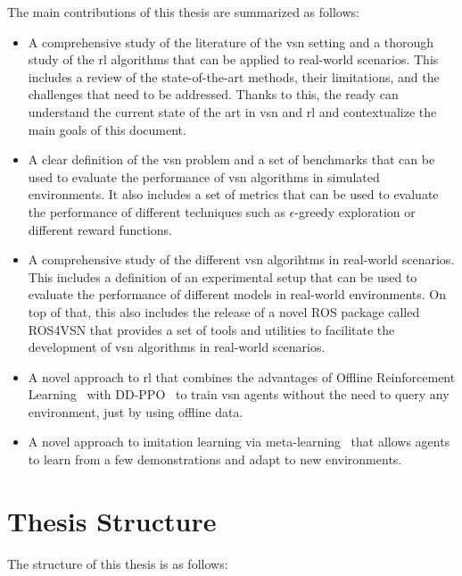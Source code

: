 The main contributions of this thesis are summarized as follows:
\begin{itemize}
    \item A comprehensive study of the literature of the \acrshort{vsn} setting and a thorough study of the \acrshort{rl} algorithms that can be applied to real-world scenarios.
    This includes a review of the state-of-the-art methods, their limitations, and the challenges that need to be addressed.
    Thanks to this, the ready can understand the current state of the art in \acrshort{vsn} and \acrshort{rl} and contextualize the main goals of this document.
    \item A clear definition of the \acrshort{vsn} problem and a set of benchmarks that can be used to evaluate the performance of \acrshort{vsn} algorithms in simulated environments.
    It also includes a set of metrics that can be used to evaluate the performance of different techniques such as $\epsilon$-greedy exploration or different reward functions.
    \item A comprehensive study of the different \acrshort{vsn} algorihtms in real-world scenarios.
    This includes a definition of an experimental setup that can be used to evaluate the performance of different models in real-world environments.
    On top of that, this also includes the release of a novel \acrfull{ROS} package called ROS4VSN that provides a set of tools and utilities to facilitate the development of \acrshort{vsn} algorithms in real-world scenarios.
    \item A novel approach to \acrshort{rl} that combines the advantages of Offline Reinforcement Learning~\cite{levine2020} with DD-PPO~\cite{Wijmans2019DDPPOLN} to train \acrshort{vsn} agents without the need to query any environment, just by using offline data.
    \item A novel approach to imitation learning via meta-learning~\cite{finnOneShotVisualImitation2017} that allows agents to learn from a few demonstrations and adapt to new environments.
\end{itemize}

\section{Thesis Structure}\label{sec:thesis-structure}

The structure of this thesis is as follows:

